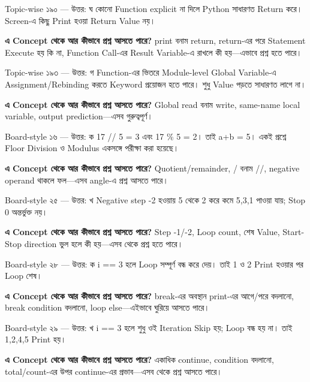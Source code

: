 \begin{explainbox}{Topic-wise ১৯০ — উত্তর: ঘ}
কোনো Function explicit  না দিলে Python সাধারণত  Return করে। Screen-এ কিছু Print হওয়া Return Value নয়।

\textbf{এ Concept থেকে আর কীভাবে প্রশ্ন আসতে পারে?} print বনাম return, return-এর পরে Statement Execute হয় কি না, Function Call-এর Result Variable-এ রাখলে কী হয়—এভাবে প্রশ্ন হতে পারে।
\end{explainbox}

\begin{explainbox}{Topic-wise ১৯৩ — উত্তর: গ}
Function-এর ভিতরে Module-level Global Variable-এ Assignment/Rebinding করতে  Keyword প্রয়োজন হতে পারে। শুধু Value পড়তে সাধারণত লাগে না।

\textbf{এ Concept থেকে আর কীভাবে প্রশ্ন আসতে পারে?} Global read বনাম write, same-name local variable, output prediction—এসব গুরুত্বপূর্ণ।
\end{explainbox}

\begin{explainbox}{Board-style ১৬ — উত্তর: ক}
17 // 5 = 3 এবং 17 \% 5 = 2। তাই a+b = 5। একই প্রশ্নে Floor Division ও Modulus একসঙ্গে পরীক্ষা করা হয়েছে।

\textbf{এ Concept থেকে আর কীভাবে প্রশ্ন আসতে পারে?} Quotient/remainder, / বনাম //, negative operand থাকলে ফল—এসব angle-এ প্রশ্ন আসতে পারে।
\end{explainbox}

\begin{explainbox}{Board-style ২৫ — উত্তর: খ}
Negative step -2 হওয়ায় 5 থেকে 2 করে কমে 5,3,1 পাওয়া যায়; Stop 0 অন্তর্ভুক্ত নয়।

\textbf{এ Concept থেকে আর কীভাবে প্রশ্ন আসতে পারে?} Step -1/-2, Loop count, শেষ Value, Start-Stop direction ভুল হলে কী হয়—এসব থেকে প্রশ্ন হতে পারে।
\end{explainbox}

\begin{explainbox}{Board-style ২৮ — উত্তর: ক}
i == 3 হলে  Loop সম্পূর্ণ বন্ধ করে দেয়। তাই 1 ও 2 Print হওয়ার পর Loop শেষ।

\textbf{এ Concept থেকে আর কীভাবে প্রশ্ন আসতে পারে?} break-এর অবস্থান print-এর আগে/পরে বদলানো, break condition বদলানো, loop else—এইভাবে ঘুরিয়ে আসতে পারে।
\end{explainbox}

\begin{explainbox}{Board-style ২৯ — উত্তর: খ}
i == 3 হলে শুধু ওই Iteration Skip হয়; Loop বন্ধ হয় না। তাই 1,2,4,5 Print হয়।

\textbf{এ Concept থেকে আর কীভাবে প্রশ্ন আসতে পারে?} একাধিক continue, condition বদলানো, total/count-এর উপর continue-এর প্রভাব—এসব থেকে প্রশ্ন আসতে পারে।
\end{explainbox}

